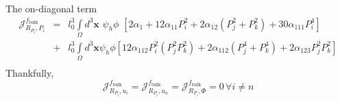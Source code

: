 \documentclass[16pt]{article} %
\begin{document}
The on-diagonal term 
\begin{eqnarray}\nonumber
\mathscr{J}_{R_{P_i}, P_i}^{f_\mathrm{bulk}} &=&l_0^3 \int\limits_\Omega d^3 {\boldsymbol x} \,\, \psi_h \phi \,\, \left[2 \alpha_1  + 12 \alpha_{11} P_i^2 + 2 \alpha_{12} \left(P_j^2 + P_k^2 \right) + 30 \alpha_{111} P_i^4 \right] \\ \nonumber
&+&l_0^3\int\limits_\Omega d^3 {\boldsymbol x} \psi_h \phi  \left[ 12 \alpha_{112} P_i^2 \left(P_j^2 P_k^2 \right) + 2 \alpha_{112} \left(P_j^4 + P_k^4 \right) + 2 \alpha_{123} P_j^2 P_k^2 \right]\\ \nonumber
\end{eqnarray}
%
Thankfully, 
%
$$\mathscr{J}_{R_{P_i} , u_i}^{f_\mathrm{bulk}} = \mathscr{J}_{R_{P_i} , u_n}^{f_\mathrm{bulk}} = \mathscr{J}_{R_{P_i} , \Phi}^{f_\mathrm{bulk}} = 0 \,\forall i \neq n $$
%
\newpage
%
\end{document}
